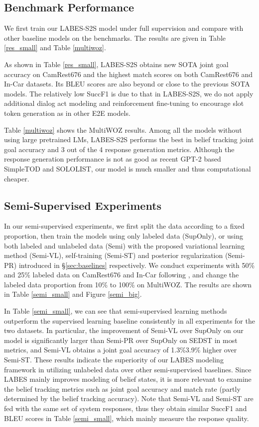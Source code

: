 \documentclass[11pt,a4paper]{article}
\newcommand{\modelname}{LABES}
\begin{document}
	\subsection{Benchmark Performance}
	\label{sec:res_sup}
	We first train our \modelname{}-S2S model under full supervision and compare with other baseline models on the benchmarks. The results are given in Table \ref{res_small} and Table \ref{multiwoz}.


	
	As shown in Table \ref{res_small}, \modelname{}-S2S obtains new SOTA joint goal accuracy on CamRest676 and the highest match scores on both CamRest676 and In-Car datasets. Its BLEU scores are also beyond or close to the previous SOTA models. 
	The relatively low SuccF1 is due to that in \modelname{}-S2S, we do not apply additional dialog act modeling and reinforcement fine-tuning to encourage slot token generation as in other E2E models.
	
	Table \ref{multiwoz} shows the MultiWOZ results. Among all the models without using large pretrained LMs, \modelname{}-S2S performs the best in belief tracking joint goal accuracy and 3 out of the 4 response generation metrics. Although the response generation performance is not as good as recent GPT-2 based SimpleTOD and SOLOLIST, our model is much smaller and thus computational cheaper.
	
	\subsection{Semi-Supervised Experiments}
	\label{sec:semi_exp}
In our semi-supervised experiments, we first split the data according to a fixed proportion, then train the models using only labeled data (SupOnly), or using both labeled and unlabeled data (Semi) with the proposed variational learning method (Semi-VL), self-training (Semi-ST) and posterior regularization (Semi-PR) introduced in \S\ref{sec:baselines} respectively. We conduct experiments with 50\% and 25\% labeled data on CamRest676 and In-Car following \citet{sedst}, and change the labeled data proportion from 10\% to 100\% on MultiWOZ. The results are shown in Table \ref{semi_small} and Figure \ref{semi_big}.  
	
	In Table \ref{semi_small}, we can see that semi-supervised learning methods outperform the supervised learning baseline consistently in all experiments for the two datasets. In particular, the improvement of Semi-VL over SupOnly on our model is significantly larger than Semi-PR over SupOnly on SEDST in most metrics, and Semi-VL obtains a joint goal accuracy of 1.3\%3.9\% higher over Semi-ST. These results indicate the superiority of our LABES modeling framework in utilizing unlabeled data over other semi-supervised baselines. Since LABES mainly improves modeling of belief states, it is more relevant to examine the belief tracking metrics such as joint goal accuracy and match rate (partly determined by the belief tracking accuracy). 
	Note that Semi-VL and Semi-ST are fed with the same set of system responses, thus they obtain similar SuccF1 and BLEU scores in Table \ref{semi_small}, which mainly measure the response quality.
	
\end{document}
